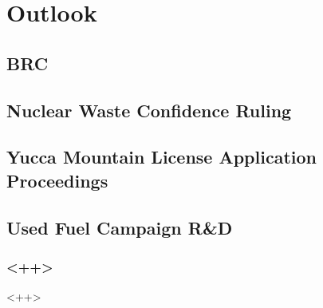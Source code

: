 \documentclass{beamer}
\begin{document}
\section{Outlook}
\subsection{BRC}

\subsection{Nuclear Waste Confidence Ruling}

\subsection{Yucca Mountain License Application Proceedings}

\subsection{Used Fuel Campaign R\&D}



\begin{frame}[<+ctb!+>]
  \frametitle{<++>}
\end{frame}<++>

\end{document}
